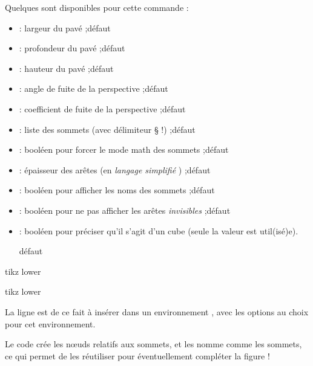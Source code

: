\begin{cautionblock}
Quelques  sont disponibles pour cette commande :

\begin{itemize}
	\item {} : largeur du pavé ;\hfill{}défaut 
	\item {} : profondeur du pavé ;\hfill{}défaut 
	\item {} : hauteur du pavé ;\hfill{}défaut 
	\item {} : angle de fuite de la perspective ;\hfill{}défaut 
	\item {} : coefficient de fuite de la perspective ;\hfill{}défaut 
	\item {} : liste des sommets (avec délimiteur § !) ;\hfill{}défaut 
	\item {} : booléen pour forcer le mode math des sommets ;\hfill{}défaut 
	\item {} : épaisseur des arêtes (en \textit{langage simplifié} \TikZ) ;\hfill{}défaut 
	\item {} : booléen pour afficher les noms des sommets ;\hfill{}défaut 
	\item {} : booléen pour ne pas afficher les arêtes \textit{invisibles} ;\hfill{}défaut 
	\item {} : booléen pour préciser qu'il s'agit d'un cube (seule la valeur  est util(isé)e).
	
	\hfill{}défaut 
\end{itemize}
\vspace*{-\baselineskip}\leavevmode
\end{cautionblock}

\begin{PresCodePL}{tikz lower}
\PaveTikz
\end{PresCodePL}

\begin{PresCodePL}{tikz lower}
\PaveTikz[Cube,Largeur=2]
\end{PresCodePL}

\begin{noteblock}
La ligne est de ce fait à insérer dans un environnement \TikZ, avec les options au choix pour cet environnement.

Le code crée les nœuds relatifs aux sommets, et les nomme comme les sommets, ce qui permet de les réutiliser pour éventuellement compléter la figure !
\end{noteblock}

